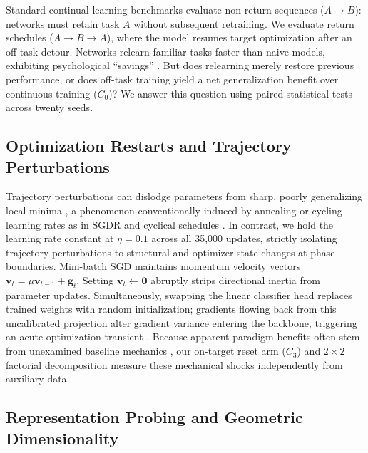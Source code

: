 \documentclass[sn-mathphys,Numbered]{sn-jnl}
\begin{document}
Standard continual learning benchmarks evaluate non-return sequences ($A \to B$): networks must retain task $A$ without subsequent retraining. We evaluate return schedules ($A \to B \to A$), where the model resumes target optimization after an off-task detour. Networks relearn familiar tasks faster than naive models, exhibiting psychological ``savings'' \cite{davidson2020sequential}. But does relearning merely restore previous performance, or does off-task training yield a net generalization benefit over continuous training ($C_0$)? We answer this question using paired statistical tests across twenty seeds.

\subsection{Optimization Restarts and Trajectory Perturbations}\label{subsec:related_optimization}

Trajectory perturbations can dislodge parameters from sharp, poorly generalizing local minima \cite{keskar2017largebatch,izmailov2018averaging,foret2021sharpness}, a phenomenon conventionally induced by annealing or cycling learning rates as in SGDR \cite{loshchilov2017sgdr} and cyclical schedules \cite{smith2017cyclical}. In contrast, we hold the learning rate constant at $\eta = 0.1$ across all 35,000 updates, strictly isolating trajectory perturbations to structural and optimizer state changes at phase boundaries. Mini-batch SGD maintains momentum velocity vectors $\bm{v}_t = \mu \bm{v}_{t-1} + \bm{g}_t$. Setting $\bm{v}_t \leftarrow \mathbf{0}$ abruptly strips directional inertia from parameter updates. Simultaneously, swapping the linear classifier head replaces trained weights with random initialization; gradients flowing back from this uncalibrated projection alter gradient variance entering the backbone, triggering an acute optimization transient \cite{lapacz2025exploring}. Because apparent paradigm benefits often stem from unexamined baseline mechanics \cite{jung2026prior}, our on-target reset arm ($C_3$) and $2 \times 2$ factorial decomposition measure these mechanical shocks independently from auxiliary data.

\subsection{Representation Probing and Geometric Dimensionality}\label{subsec:related_probing}
\end{document}

